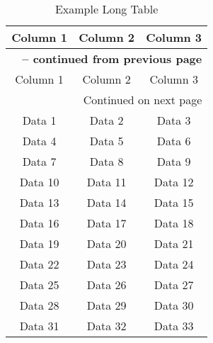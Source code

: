 \begin{longtable}{|c|c|c|}
    \caption{Example Long Table}  \label{tab:longtable}\\
    \hline
    Column 1 & Column 2 & Column 3 \\
    \hline
    \endfirsthead
    \multicolumn{3}{c}{{\bfseries \tablename\ \thetable{} -- continued from previous page}} \\
    \hline
    Column 1 & Column 2 & Column 3 \\
    \hline
    \endhead
    \hline \multicolumn{3}{|r|}{{Continued on next page}} \\ \hline
    \endfoot
    \hline
    \endlastfoot
    Data 1 & Data 2 & Data 3 \\
    Data 4 & Data 5 & Data 6 \\
    Data 7 & Data 8 & Data 9 \\
    Data 10 & Data 11 & Data 12 \\
    Data 13 & Data 14 & Data 15 \\
    Data 16 & Data 17 & Data 18 \\
    Data 19 & Data 20 & Data 21 \\
    Data 22 & Data 23 & Data 24 \\
    Data 25 & Data 26 & Data 27 \\
    Data 28 & Data 29 & Data 30 \\
    Data 31 & Data 32 & Data 33 \\
\end{longtable}
